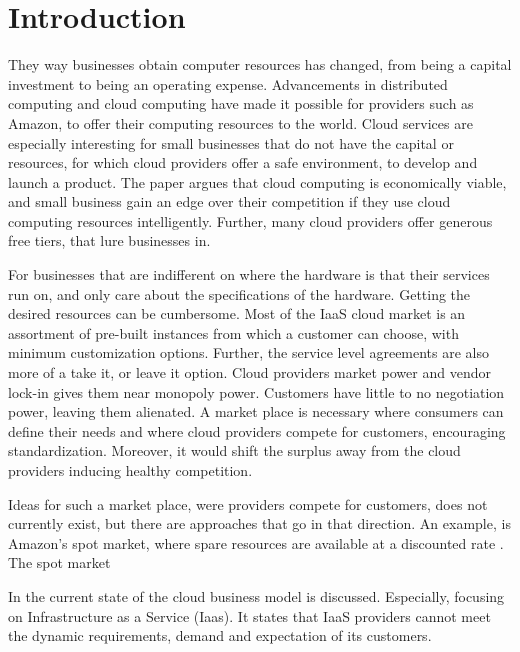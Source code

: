 \chapter{Introduction}

They way businesses obtain computer resources has changed, from being a capital investment to being an operating expense. Advancements in distributed computing and cloud computing have made it possible for providers such as Amazon, to offer their computing resources to the world. Cloud services are especially interesting for small businesses that do not have the capital or resources, for which cloud providers offer a safe environment, to develop and launch a product. The paper \cite{smallbusiness} argues that cloud computing is economically viable, and small business gain an edge over their competition if they use cloud computing resources intelligently. Further, many cloud providers offer generous free tiers, that lure businesses in.

For businesses that are indifferent on where the hardware is that their services run on, and only care about the specifications of the hardware. Getting the desired resources can be cumbersome. Most of the IaaS cloud market is an assortment of pre-built instances from which a customer can choose, with minimum customization options. Further, the service level agreements are also more of a take it, or leave it option. Cloud providers market power and vendor lock-in \cite{lock-in} gives them near monopoly power. Customers have little to no negotiation power, leaving them alienated. A market place is necessary where consumers can define their needs and where cloud providers compete for customers, encouraging standardization. Moreover, it would shift the surplus away from the cloud providers inducing healthy competition.

Ideas for such a market place, were providers compete for customers, does not currently exist, but there are approaches that go in that direction. An example, is Amazon's spot market, where spare resources are available at a discounted rate \cite{amazon_spot}. The spot market 

In \cite{utility_negotiation} the current state of the cloud business model is discussed. Especially, focusing on Infrastructure as a Service (Iaas). It states that IaaS providers cannot meet the dynamic requirements, demand and expectation of its customers.  

